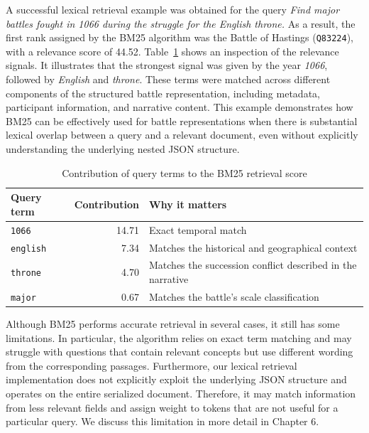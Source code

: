 A successful lexical retrieval example was obtained for the query \textit{Find major battles fought in 1066 during the struggle for the English throne.} As a result, the first rank assigned by the BM25 algorithm was the Battle of Hastings (\texttt{Q83224}), with a relevance score of 44.52. Table~\ref{tab:bm25_term_contributions} shows an inspection of the relevance signals. It illustrates that the strongest signal was given by the year \textit{1066}, followed by \textit{English} and \textit{throne}. These terms were matched across different components of the structured battle representation, including metadata, participant information, and narrative content. This example demonstrates how BM25 can be effectively used for battle representations when there is substantial lexical overlap between a query and a relevant document, even without explicitly understanding the underlying nested JSON structure.
\begin{table}[htbp]
    \centering
    \caption{Contribution of query terms to the BM25 retrieval score}
    \label{tab:bm25_term_contributions}

    \small
    \renewcommand{\arraystretch}{1.3}
    \setlength{\tabcolsep}{6pt}

    \begin{tabular}{
        l
        r
        >{\raggedright\arraybackslash}p{}
    }
        \toprule
        \textbf{Query term} &
        \textbf{Contribution} &
        \textbf{Why it matters} \\
        \midrule

        \texttt{1066} & 14.71 &
        Exact temporal match \\

        \texttt{english} & 7.34 &
        Matches the historical and geographical context \\

        \texttt{throne} & 4.70 &
        Matches the succession conflict described in the narrative \\

        \texttt{major} & 0.67 &
        Matches the battle's scale classification \\

        \bottomrule
    \end{tabular}
\end{table}

Although BM25 performs accurate retrieval in several cases, it still has some limitations. In particular, the algorithm relies on exact term matching and may struggle with questions that contain relevant concepts but use different wording from the corresponding passages. Furthermore, our lexical retrieval implementation does not explicitly exploit the underlying JSON structure and operates on the entire serialized document. Therefore, it may match information from less relevant fields and assign weight to tokens that are not useful for a particular query. We discuss this limitation in more detail in Chapter 6.

